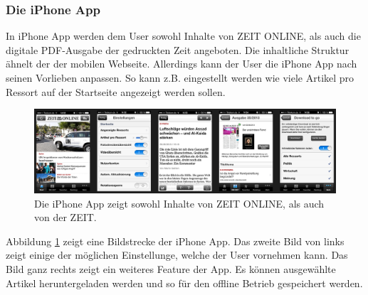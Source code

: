 \documentclass[12pt,a4paper,bibtotoc,abstracton]{scrartcl}
\begin{document}
\subsubsection{Die iPhone App}
\label{subsubsec:iphoneapp}
In iPhone App werden dem User sowohl Inhalte von ZEIT ONLINE, als auch die digitale PDF-Ausgabe der gedruckten Zeit angeboten. Die inhaltliche Struktur ähnelt der der mobilen Webseite. Allerdings kann der User die iPhone App nach seinen Vorlieben anpassen. So kann z.B. eingestellt werden wie viele Artikel pro Ressort auf der Startseite angezeigt werden sollen.

\begin{figure}[h]	
	\centering
	\includegraphics[width=\textwidth]{Bilder/Screenshots/iPhoneApp/iPhone.png} 
	\caption{Die iPhone App zeigt sowohl Inhalte von ZEIT ONLINE, als auch von der ZEIT.}
	\label{fig:iphoneapp}
\end{figure}

Abbildung \ref{fig:iphoneapp} zeigt eine Bildstrecke der iPhone App. Das zweite Bild von links zeigt einige der möglichen Einstellunge, welche der User vornehmen kann. Das Bild ganz rechts zeigt ein weiteres Feature der App. Es können ausgewählte Artikel heruntergeladen werden und so für den offline Betrieb gespeichert werden.
\end{document}
